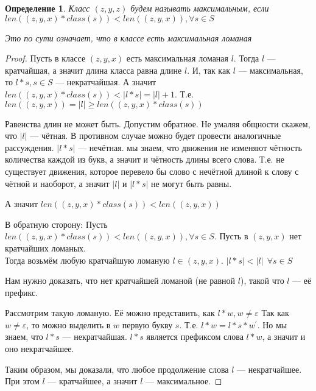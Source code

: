 \documentclass[12pt,a4paper, flushleft]{article}
\newtheorem{Def}{Определение}[section]
\newtheorem{Lm}{Лемма}[section]
\newcommand{\p}[1]{#1^{\prime}}
\begin{document}
\begin{Def}
	Класс $(z, y, z)$ будем называть максимальным, если $len((z, y, x)*class(s))<len((z, y, x)) , \forall s\in S$
	
	Это по сути означает, что в классе есть максимальная ломаная
\end{Def}
\begin{proof}
	Пусть в классе $(z, y, x)$ есть максимальная ломаная $l$. Тогда $l$ --- кратчайшая, а значит длина класса равна длине $l$. И, так как $l$ --- максимальная, то $l * s, s\in S$ --- некратчайшая. А значит $len((z, y, x)*class(s)) < |l*s| = |l|+1$. Т.е. $len((z, y, x)) = |l|\geqslant  len((z, y, x)*class(s))$
	
	Равенства длин не может быть. Допустим обратное. Не умаляя общности скажем, что $|l|$ --- чётная. В противном случае можно будет провести аналогичные рассуждения. $|l * s|$ --- нечётная. мы знаем, что движения не изменяют чётность количества каждой из букв, а значит и чётность длины всего слова. Т.е. не существует движения, которое перевело бы слово с нечётной длиной к слову с чётной и наоборот, а значит $|l|$ и $|l*s|$ не могут быть равны.
	
	А значит $len((z, y, x)*class(s))<len((z, y, x))$
	
	В обратную сторону: Пусть $len((z, y, x)*class(s))<len((z, y, x)) , \forall s\in S$. Пусть в $(z, y, x)$ нет кратчайших ломаных. \\Тогда возьмём любую кратчайшую ломаную $l\in (z, y, x)$. $|l*s| < |l|~~ \forall s\in S$
	
	Нам нужно доказать, что нет кратчайшей ломаной (не равной $l$), такой что $l$ --- её префикс.
	
	Рассмотрим такую ломаную. Её можно представить, как $l * w, w\neq \varepsilon$ Так как $w\neq \varepsilon$, то можно выделить в $w$ первую букву $s$. Т.е. $l*w = l*s*\p w$. Но мы знаем, что $l*s$ --- некратчайшая. $l*s$ является префиксом слова $l*w$, а значит и оно некратчайшее. 
	
	Таким образом, мы доказали, что любое продолжение слова $l$ --- некратчайшее. При этом $l$ --- кратчайшее, а значит $l$ --- максимальное.
	
	
\end{proof}	
%
%	
%		
%		
\end{document}
